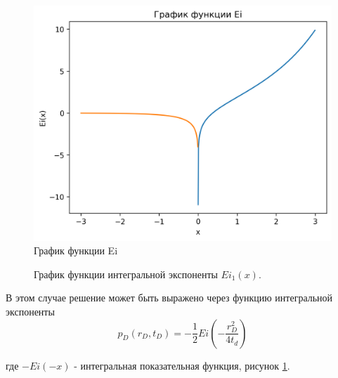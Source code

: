 \begin{figure}[h!]
	\begin{center}
		\includegraphics[width=12cm]{pics/Ei_plot_1.png}
		\caption{График функции Ei}
		\label{ris:Ei_plot_1}
	\end{center}
\end{figure}

\begin{figure}
	\begin{center}
		\caption{График функции интегральной экспоненты $Ei_1(x)$.}
		\label{ris:ei1}
	\end{center}
\end{figure}



В этом случае решение может быть выражено через функцию интегральной экспоненты 
\begin{equation}
	p_D(r_D,t_D) = - \frac{1}{2} Ei \left(- \dfrac{ r_D^2}{4t_d} \right)
\end{equation} 

где $-Ei(-x)$ - интегральная показательная функция, рисунок \ref{ris:Ei_plot_1}.

